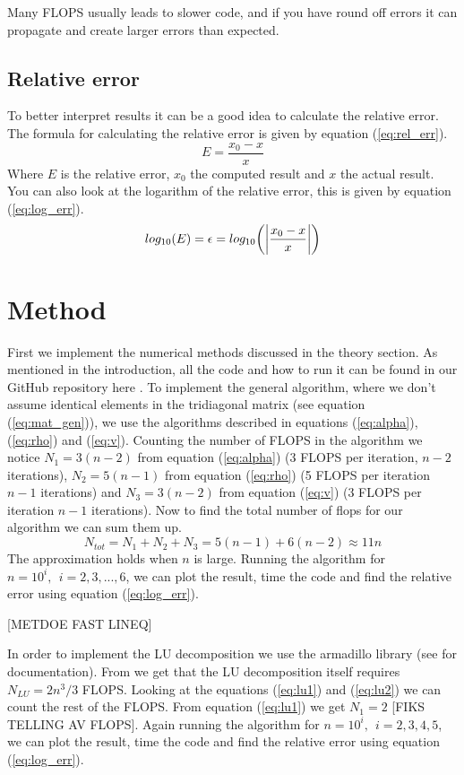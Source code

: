 \documentclass[reprint, english,notitlepage]{revtex4-1}  %
\begin{document}
Many FLOPS usually leads to slower code, and if you have round off errors it can propagate and create larger errors than expected.

\subsection{Relative error}
To better interpret results it can be a good idea to calculate the relative error. The formula for calculating the relative error is given by equation (\ref{eq:rel_err}).
\begin{equation}
	E = \frac{x_0 - x}{x}
	\label{eq:rel_err}
\end{equation}
Where $E$ is the relative error, $x_0$ the computed result and $x$ the actual result. You can also look at the logarithm of the relative error, this is given by equation (\ref{eq:log_err}).
\begin{equation}
	log_{10}(E) = \epsilon = log_{10}\bigg(\abs{\frac{x_0-x}{x}}\bigg)
	\label{eq:log_err}
\end{equation}
\section{Method}

First we implement the numerical methods discussed in the theory section. As mentioned in the introduction, all the code and how to run it can be found in our GitHub repository here \citep{github}. To implement the general algorithm, where we don't assume identical elements in the tridiagonal matrix (see equation (\ref{eq:mat_gen})), we use the algorithms described in equations (\ref{eq:alpha}), (\ref{eq:rho}) and (\ref{eq:v}). Counting the number of FLOPS in the algorithm we notice $N_1 = 3(n-2)$ from equation (\ref{eq:alpha}) (3 FLOPS per iteration, $n-2$ iterations), $N_2 = 5(n-1)$ from equation (\ref{eq:rho}) (5 FLOPS per iteration $n-1$ iterations) and $N_3 = 3(n-2)$ from equation (\ref{eq:v}) (3 FLOPS per iteration $n-1$ iterations). Now to find the total number of flops for our algorithm we can sum them up.
\begin{equation*}
	N_{tot} = N_1+N_2+N_3 = 5(n-1) + 6(n-2) \approx 11n
\end{equation*}
The approximation holds when $n$ is large. Running the algorithm for $n=10^i,\ \ i = 2, 3, ..., 6$, we can plot the result, time the code and find the relative error using equation (\ref{eq:log_err}).

[METDOE FAST LINEQ]

In order to implement the LU decomposition we use the armadillo library (see \citep{armadillo} for documentation). From \citep{lu_wiki} we get that the LU decomposition itself requires $N_{LU} = 2n^3/3$ FLOPS. Looking at the equations (\ref{eq:lu1}) and (\ref{eq:lu2}) we can count the rest of the FLOPS. From equation (\ref{eq:lu1}) we get $N_1 = 2$ [FIKS TELLING AV FLOPS]. Again running the algorithm for $n=10^i,\ \ i = 2, 3, 4, 5$, we can plot the result, time the code and find the relative error using equation (\ref{eq:log_err}).
\end{document}
